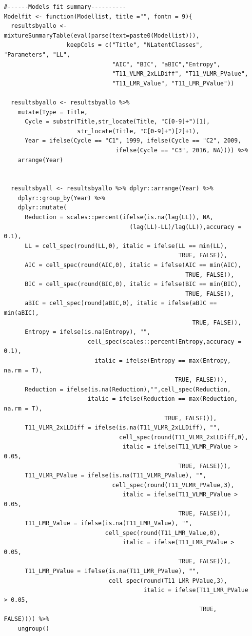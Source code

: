 \documentclass[12pt,a4paper,oneside]{reedthesis}
\begin{document}
\begin{verbatim}
#------Models fit summary----------
Modelfit <- function(Modellist, title ="", fontn = 9){
  resultsbyallo <- mixtureSummaryTable(eval(parse(text=paste0(Modellist))),
                  keepCols = c("Title", "NLatentClasses", "Parameters", "LL", 
                               "AIC", "BIC", "aBIC","Entropy", 
                               "T11_VLMR_2xLLDiff", "T11_VLMR_PValue",  
                               "T11_LMR_Value", "T11_LMR_PValue"))
  
  resultsbyallo <- resultsbyallo %>% 
    mutate(Type = Title,
      Cycle = substr(Title,str_locate(Title, "C[0-9]+")[1], 
                     str_locate(Title, "C[0-9]+")[2]+1),
      Year = ifelse(Cycle == "C1", 1999, ifelse(Cycle == "C2", 2009, 
                                ifelse(Cycle == "C3", 2016, NA)))) %>% 
    arrange(Year)
  

  resultsbyall <- resultsbyallo %>% dplyr::arrange(Year) %>% 
    dplyr::group_by(Year) %>%  
    dplyr::mutate(
      Reduction = scales::percent(ifelse(is.na(lag(LL)), NA, 
                                    (lag(LL)-LL)/lag(LL)),accuracy = 0.1),
      LL = cell_spec(round(LL,0), italic = ifelse(LL == min(LL), 
                                                  TRUE, FALSE)),
      AIC = cell_spec(round(AIC,0), italic = ifelse(AIC == min(AIC), 
                                                    TRUE, FALSE)),
      BIC = cell_spec(round(BIC,0), italic = ifelse(BIC == min(BIC), 
                                                    TRUE, FALSE)),
      aBIC = cell_spec(round(aBIC,0), italic = ifelse(aBIC == min(aBIC), 
                                                      TRUE, FALSE)),
      Entropy = ifelse(is.na(Entropy), "", 
                        cell_spec(scales::percent(Entropy,accuracy = 0.1), 
                          italic = ifelse(Entropy == max(Entropy, na.rm = T), 
                                                 TRUE, FALSE))),
      Reduction = ifelse(is.na(Reduction),"",cell_spec(Reduction, 
                        italic = ifelse(Reduction == max(Reduction, na.rm = T), 
                                              TRUE, FALSE))),
      T11_VLMR_2xLLDiff = ifelse(is.na(T11_VLMR_2xLLDiff), "", 
                                 cell_spec(round(T11_VLMR_2xLLDiff,0), 
                                  italic = ifelse(T11_VLMR_PValue > 0.05, 
                                                  TRUE, FALSE))),
      T11_VLMR_PValue = ifelse(is.na(T11_VLMR_PValue), "", 
                               cell_spec(round(T11_VLMR_PValue,3), 
                                  italic = ifelse(T11_VLMR_PValue > 0.05, 
                                                  TRUE, FALSE))),
      T11_LMR_Value = ifelse(is.na(T11_LMR_Value), "", 
                             cell_spec(round(T11_LMR_Value,0), 
                                  italic = ifelse(T11_LMR_PValue > 0.05, 
                                                  TRUE, FALSE))),
      T11_LMR_PValue = ifelse(is.na(T11_LMR_PValue), "", 
                              cell_spec(round(T11_LMR_PValue,3), 
                                        italic = ifelse(T11_LMR_PValue > 0.05, 
                                                        TRUE, FALSE)))) %>% 
    ungroup()
  

\end{verbatim}
\end{document}
